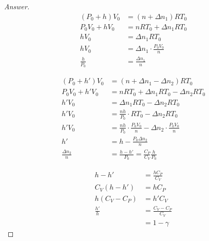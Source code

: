 \documentclass[../psets.tex]{subfiles}
\begin{document}
\begin{enumerate}
\begin{proof}[Answer]
        \begin{align*}
            (P_0+h)V_0 &= (n+\Delta n_1)RT_0\\
            P_0V_0+hV_0 &= nRT_0+\Delta n_1RT_0\\
            hV_0 &= \Delta n_1RT_0\\
            hV_0 &= \Delta n_1\cdot\frac{P_0V_0}{n}\\
            \frac{h}{P_0} &= \frac{\Delta n_1}{n}
        \end{align*}


        \begin{align*}
            (P_0+h')V_0 &= (n+\Delta n_1-\Delta n_2)RT_0\\
            P_0V_0+h'V_0 &= nRT_0+\Delta n_1RT_0-\Delta n_2RT_0\\
            h'V_0 &= \Delta n_1RT_0-\Delta n_2RT_0\\
            h'V_0 &= \frac{nh}{P_0}\cdot RT_0-\Delta n_2RT_0\\
            h'V_0 &= \frac{nh}{P_0}\cdot\frac{P_0V_0}{n}-\Delta n_2\cdot\frac{P_0V_0}{n}\\
            h' &= h-\frac{P_0\Delta n_2}{n}\\
            \frac{\Delta n_2}{n} &= \frac{h-h'}{P_0} = \frac{C_P}{C_V}\frac{h}{P_0}
        \end{align*}


        \begin{align*}
            h-h' &= \frac{hC_P}{C_V}\\
            C_V(h-h') &= hC_P\\
            h(C_V-C_P) &= h'C_V\\
            \frac{h'}{h} &= \frac{C_V-C_P}{C_V}\\
            &= 1-\gamma
        \end{align*}


\end{proof}
\end{enumerate}
\end{document}
